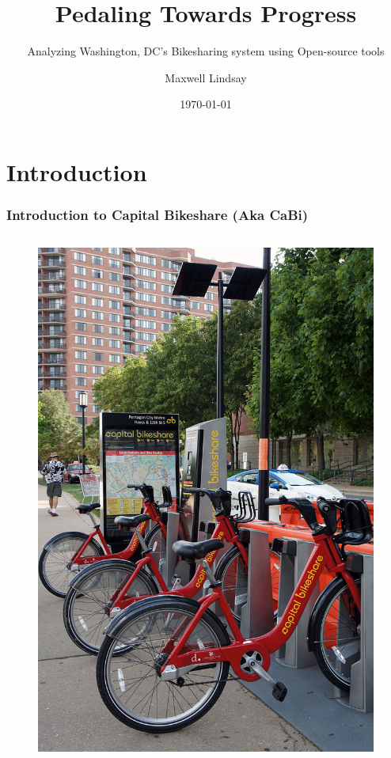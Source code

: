 \documentclass{beamer}
\title{Pedaling Towards Progress}
\subtitle{Analyzing Washington, DC's Bikesharing system using Open-source tools}
\author{Maxwell Lindsay}
\institute{Van Oord}
\date{\today}
\begin{document}
\begin{frame}
    \titlepage
\end{frame}
\section{Introduction}
\begin{frame}
    \frametitle{Introduction to Capital Bikeshare (Aka CaBi)}
    \begin{columns}
        \begin{figure}
            \includegraphics[]{800px-VA_07_2012_Capital_Bikeshare_4152.JPG}

\end{figure}
\end{columns}
\end{frame}
\end{document}
